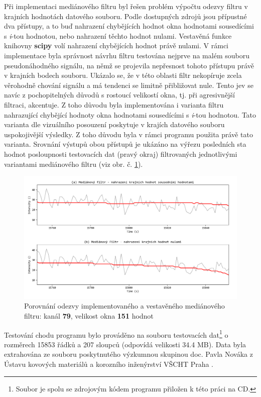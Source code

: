 \documentclass[a4paper, 12pt]{article}
\begin{document}
\noindent Při implementaci mediánového filtru byl řešen problém výpočtu odezvy filtru v krajních hodnotách datového souboru. Podle dostupných zdrojů jsou přípustné dva přístupy, a to buď nahrazení chybějících hodnot okna hodnotami sousedícími s \textit{i}-tou hodnotou, nebo nahrazení těchto hodnot nulami. Vestavěná funkce knihovny \textbf{scipy} volí nahrazení chybějících hodnot právě nulami. V rámci implementace byla správnost návrhu filtru testována nejprve na malém souboru pseudonáhodného signálu, na němž se projevila nepřesnost tohoto přístupu právě v krajních bodech souboru. Ukázalo se, že v této oblasti filtr nekopíruje zcela věrohodně chování signálu a má tendenci se limitně přibližovat nule. Tento jev se navíc z pochopitelných důvodů s rostoucí velikostí okna, tj. při agresivnější filtraci, akcentuje.
\vskip 0.08in
\noindent Z toho důvodu byla implementována i varianta filtru nahrazující chybějící hodnoty okna hodnotami sousedícími s \textit{i}-tou hodnotou. Tato varianta dle vizuálního posouzení poskytuje v krajích datového souboru uspokojivější výsledky. Z toho důvodu byla v rámci programu použita právě tato varianta. Srovnání výstupů obou přístupů je ukázáno na výřezu posledních sta hodnot posloupnosti testovacích dat (pravý okraj) filtrovaných jednotlivými variantami mediánového filtru (viz obr. č. \ref{fig:median_srovnani}). \par
\begin{figure}[h!]
 \centering
 \includegraphics[width=\linewidth,height=0.65\linewidth]{median_diskuse.png}
 \caption{Porovnání odezvy implementovaného a vestavěného mediánového filtru: kanál \textbf{79}, velikost okna \textbf{151} hodnot}
 \label{fig:median_srovnani}
\end{figure}
Testování chodu programu bylo prováděno na souboru testovacích dat\footnote{Soubor  je spolu se zdrojovým kódem programu přiložen k této práci na CD.} o rozměrech 15853 řádků a 207 sloupců (odpovídá velikosti 34.4 MB). Data byla extrahována ze souboru poskytnutého výzkumnou skupinou doc. Pavla Nováka z Ústavu kovových materiálů a korozního inženýrství VŠCHT Praha . 
\end{document}
